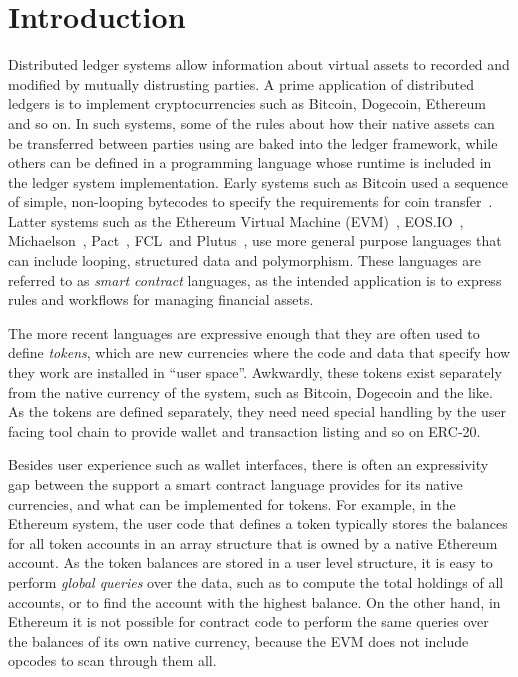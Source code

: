 
\section{Introduction}
Distributed ledger systems allow information about virtual assets to recorded and modified by mutually distrusting parties. A prime application of distributed ledgers is to implement cryptocurrencies such as Bitcoin, Dogecoin, Ethereum and so on. In such systems, some of the rules about how their native assets can be transferred between parties using are baked into the ledger framework, while others can be defined in a programming language whose runtime is included in the ledger system implementation. Early systems such as Bitcoin used a sequence of simple, non-looping bytecodes to specify the requirements for coin transfer~\CITE. Latter systems such as the Ethereum Virtual Machine (EVM)~\CITE, EOS.IO~\CITE, Michaelson~\CITE, Pact~\CITE, FCL~\CITE and Plutus~\CITE, use more general purpose languages that can include looping, structured data and polymorphism. These languages are referred to as \emph{smart contract} languages, as the intended application is to express rules and workflows for managing financial assets.

The more recent languages are expressive enough that they are often used to define \emph{tokens}, which are new currencies where the code and data that specify how they work are installed in ``user space''. Awkwardly, these tokens exist separately from the native currency of the system, such as Bitcoin, Dogecoin and the like. As the tokens are defined separately, they need need special handling by the user facing tool chain to provide wallet and transaction listing and so on \CITE ERC-20.

Besides user experience such as wallet interfaces, there is often an expressivity gap between the support a smart contract language provides for its native currencies, and what can be implemented for tokens. For example, in the Ethereum system, the user code that defines a token typically stores  the balances for all token accounts in an array structure that is owned by a native Ethereum account. As the token balances are stored in a user level structure, it is easy to perform \emph{global queries} over the data, such as to compute the total holdings of all accounts, or to find the account with the highest balance. On the other hand, in Ethereum it is not possible for contract code to perform the same queries over the balances of its own native currency, because the EVM does not include opcodes to scan through them all.

